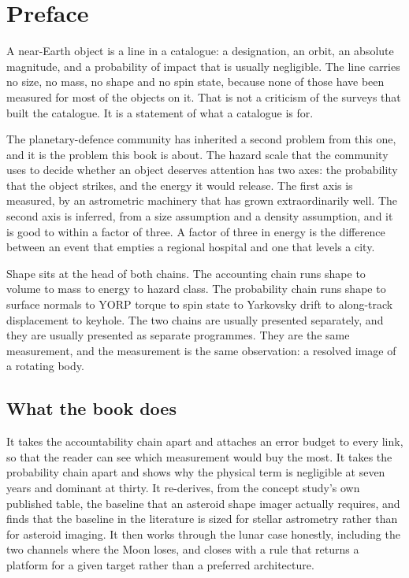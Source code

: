 \chapter*{Preface}
\thispagestyle{plain}

A near-Earth object is a line in a catalogue: a designation, an orbit, an
absolute magnitude, and a probability of impact that is usually negligible. The
line carries no size, no mass, no shape and no spin state, because none of
those have been measured for most of the objects on it. That is not a criticism
of the surveys that built the catalogue. It is a statement of what a catalogue
is for.

The planetary-defence community has inherited a second problem from this one,
and it is the problem this book is about. The hazard scale that the community
uses to decide whether an object deserves attention has two axes: the
probability that the object strikes, and the energy it would release. The
first axis is measured, by an astrometric machinery that has grown
extraordinarily well. The second axis is inferred, from a size assumption and
a density assumption, and it is good to within a factor of three. A factor of
three in energy is the difference between an event that empties a regional
hospital and one that levels a city.

Shape sits at the head of both chains. The accounting chain runs shape to
volume to mass to energy to hazard class. The probability chain runs shape to
surface normals to YORP torque to spin state to Yarkovsky drift to along-track
displacement to keyhole. The two chains are usually presented separately, and
they are usually presented as separate programmes. They are the same
measurement, and the measurement is the same observation: a resolved image of
a rotating body.

\section*{What the book does}

It takes the accountability chain apart and attaches an error budget to every
link, so that the reader can see which measurement would buy the most. It
takes the probability chain apart and shows why the physical term is
negligible at seven years and dominant at thirty. It re-derives, from the
concept study's own published table, the baseline that an asteroid shape
imager actually requires, and finds that the baseline in the literature is
sized for stellar astrometry rather than for asteroid imaging. It then works
through the lunar case honestly, including the two channels where the Moon
loses, and closes with a rule that returns a platform for a given target
rather than a preferred architecture.

